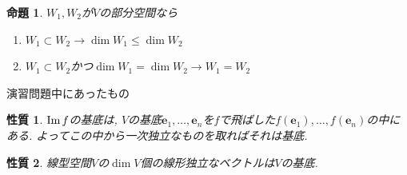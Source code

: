 \documentclass[a4j,dvipdfmx]{jsarticle}
\renewcommand{\Im}{\mathrm{Im}\hspace{0.5mm}}
\newcommand{\Slash}{\hrulefill 演習問題中にあったもの \hrulefill}
\theoremstyle{mystyle}
\newtheorem{proposition}[theorem]{命題}
\newtheorem*{property}{性質}
\begin{document}
    \begin{proposition}
        $W_1,W_2$が$V$の部分空間なら
        \begin{enumerate}
            \item $W_1\subset W_2\rightarrow \dim W_1\leq \dim W_2$
            \item $W_1\subset W_2$かつ$\dim W_1=\dim W_2\rightarrow W_1=W_2$
        \end{enumerate}
    \end{proposition}
    \Slash
    \begin{property}
        $\Im f$の基底は, $V$の基底$\bm{e}_1,\dots,\bm{e}_n$を$f$で飛ばした$f(\bm{e}_1),\dots,f(\bm{e}_n)$の中にある. よってこの中から一次独立なものを取ればそれは基底.
    \end{property}
    \begin{property}
        線型空間$V$の$\dim V$個の線形独立なベクトルは$V$の基底.
    \end{property}
    \clearpage
\end{document}
